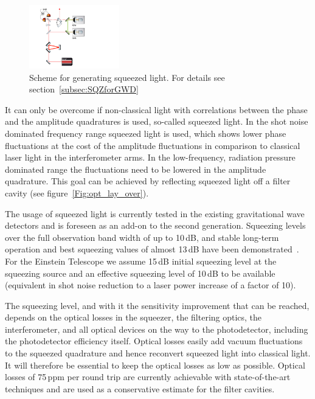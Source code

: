 \begin{figure}
	\centering
		\includegraphics[width=0.35\textwidth]{Sec_Introduction/SqzGenIntro.pdf}
	\caption{Scheme for generating squeezed light. For details see section~\ref{subsec:SQZforGWD}}
	\label{fig:SqzGenIntro}
\end{figure} 

It can only be overcome if non-classical light with correlations between the phase 
and the amplitude quadratures is used, so-called squeezed light. In the shot noise 
dominated frequency range squeezed light is used, which shows lower phase 
fluctuations at the cost of the amplitude fluctuations in comparison to classical 
laser light in the interferometer arms. In the low-frequency, radiation pressure 
dominated range the fluctuations need to be lowered in the amplitude quadrature. 
This goal can be achieved by reflecting squeezed light off a filter cavity (see 
figure~\ref{Fig:opt_lay_over}). 

The usage of squeezed light is currently tested in the existing gravitational wave 
detectors and is foreseen as an add-on to the second generation. Squeezing 
levels over the full observation band width of up to 10\,dB, and stable long-term 
operation and best squeezing values of almost 13\,dB have been demonstrated~\cite{Eberle2010}. 
For the Einstein Telescope we assume 15\,dB initial squeezing 
level at the squeezing source and an effective squeezing level of 10\,dB to be 
available (equivalent in shot noise reduction to a laser power increase of a factor
of 10). 

The squeezing level, and with it the sensitivity improvement that can be reached, 
depends on the optical losses in the squeezer, the filtering optics, the interferometer, 
and all optical devices on the way to the photodetector, including the photodetector 
efficiency itself. Optical losses easily add vacuum fluctuations to the squeezed quadrature 
and hence reconvert squeezed light into classical light. It will therefore be essential 
to keep the optical losses as low as possible. Optical losses of 75\,ppm per round 
trip are currently achievable with state-of-the-art techniques and are used as a 
conservative estimate for the filter cavities.

